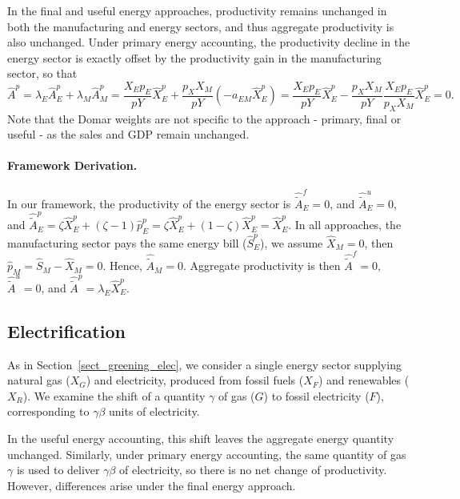 \documentclass[11pt]{article}
\begin{document}
In the final and useful energy approaches, productivity remains unchanged in both the manufacturing and energy sectors, and thus aggregate productivity is also unchanged. Under primary energy accounting, the productivity decline in the energy sector is exactly offset by the productivity gain in the manufacturing sector, so that
\[
\hat{A}^p=\lambda_E \hat{A}_E^p+\lambda_M \hat{A}_M^p=\frac{X_Ep_E}{pY} \hat{X}_E^p+ \frac{p_XX_M}{pY} (-a_{EM}\hat{X}_E^p)=\frac{X_Ep_E}{pY} \hat{X}_E^p - \frac{p_XX_M}{pY} \frac{X_Ep_E}{p_XX_M}\hat{X}_E^p=0.
\]
Note that the Domar weights are not specific to the approach - primary, final or useful - as the sales and GDP remain unchanged. 

\paragraph{Framework Derivation.}
In our framework, the productivity of the energy sector is $\hat{\tilde{A}}_E^f = 0$, and $\hat{\tilde{A}}_E^u = 0$, and  $\hat{\tilde{A}}_E^p=\zeta \hat{X}_E^p+(\zeta-1) \hat{p}_E^p=\zeta \hat{X}_E^p+(1-\zeta) \hat{X}_E^p=\hat{X}_E^p$. In all approaches, the manufacturing sector pays the same energy bill ($\hat{S}_E^p$), we assume $\hat{X}_M=0$, then $\hat{p}_M=\hat{S}_M-\hat{X}_M= 0$. Hence, $\hat{\tilde{A}}_M=0$. Aggregate productivity is then $\hat{\tilde{A}}^f=0$, $\hat{\tilde{A}}^u=0$, and $\hat{\tilde{A}}^p = \lambda_E \hat{X}_E^p$.

\subsection{Electrification}
\label{sect_energy_electrification}

As in Section~\ref{sect_greening_elec}, we consider a single energy sector supplying natural gas ($X_G$) and electricity, produced from fossil fuels ($X_F$) and renewables ($X_R$). We examine the shift of a quantity $\gamma$ of gas ($G$) to fossil electricity ($F$), corresponding to $\gamma\beta$ units of electricity.  

In the useful energy accounting, this shift leaves the aggregate energy quantity unchanged. Similarly, under primary energy accounting, the same quantity of gas $\gamma$ is used to deliver $\gamma\beta$ of electricity, so there is no net change of productivity. However, differences arise under the final energy approach.  

\vspace{3mm}
\end{document}
